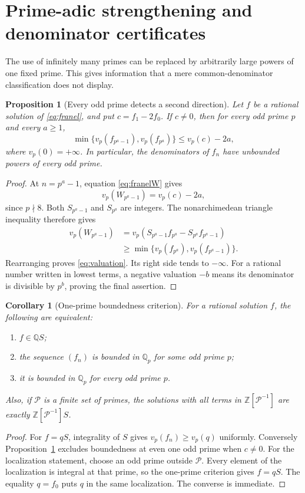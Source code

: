 \documentclass[11pt,a4paper]{article}
\newtheorem{proposition}[theorem]{Proposition}
\newtheorem{corollary}[theorem]{Corollary}
\theoremstyle{definition}\newtheorem{definition}[theorem]{Definition}
\theoremstyle{remark}\newtheorem{remark}[theorem]{Remark}
\newcommand{\Q}{\mathbb Q}\newcommand{\Z}{\mathbb Z}\newcommand{\N}{\mathbb N}\newcommand{\R}{\mathbb R}\newcommand{\C}{\mathbb C}
\begin{document}
\section{Prime-adic strengthening and denominator certificates}\label{sec:padic}
The use of infinitely many primes can be replaced by arbitrarily large powers
of one fixed prime. This gives information that a mere common-denominator
classification does not display.

\begin{proposition}[Every odd prime detects a second direction]\label{prop:local}
Let $f$ be a rational solution of \eqref{eq:franel}, and put $c=f_1-2f_0$.
If $c\ne0$, then for every odd prime $p$ and every $a\ge1$,
\begin{equation}\label{eq:valuation}
 \min\{v_p(f_{p^a-1}),v_p(f_{p^a})\}\le v_p(c)-2a,
\end{equation}
where $v_p(0)=+\infty$. In particular, the denominators of $f_n$ have
unbounded powers of every odd prime.
\end{proposition}
\begin{proof}
At $n=p^a-1$, equation \eqref{eq:franelW} gives
\[
 v_p(W_{p^a-1})=v_p(c)-2a,
\]
since $p\nmid8$. Both $S_{p^a-1}$ and $S_{p^a}$ are integers. The
nonarchimedean triangle inequality therefore gives
\begin{align*}
 v_p(W_{p^a-1})
 &=v_p(S_{p^a-1}f_{p^a}-S_{p^a}f_{p^a-1})\\
 &\ge\min\{v_p(f_{p^a}),v_p(f_{p^a-1})\}.
\end{align*}
Rearranging proves \eqref{eq:valuation}. Its right side tends to $-\infty$.
For a rational number written in lowest terms, a negative valuation $-b$
means its denominator is divisible by $p^b$, proving the final assertion.
\end{proof}

\begin{corollary}[One-prime boundedness criterion]\label{cor:oneprime}
For a rational solution $f$, the following are equivalent:
\begin{enumerate}[label=(\roman*)]
\item $f\in\Q S$;
\item the sequence $(f_n)$ is bounded in $\Q_p$ for some odd prime $p$;
\item it is bounded in $\Q_p$ for every odd prime $p$.
\end{enumerate}
Also, if $\mathcal P$ is a finite set of primes, the solutions with all terms
in $\Z[\mathcal P^{-1}]$ are exactly
$\Z[\mathcal P^{-1}]S$.
\end{corollary}
\begin{proof}
For $f=qS$, integrality of $S$ gives $v_p(f_n)\ge v_p(q)$ uniformly.
Conversely Proposition~\ref{prop:local} excludes boundedness at even one odd
prime when $c\ne0$. For the localization statement, choose an odd prime outside
$\mathcal P$. Every element of the localization is integral at that prime, so
the one-prime criterion gives $f=qS$. The equality $q=f_0$ puts $q$ in the same
localization. The converse is immediate.
\end{proof}
\end{document}
